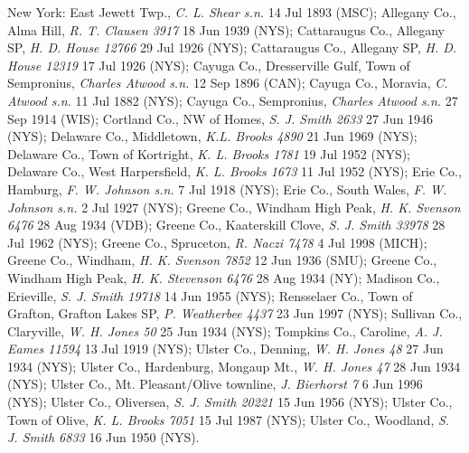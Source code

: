 \documentclass{article}
\begin{document}
New York:
East Jewett Twp., \textit{C. L. Shear s.n.} 14 Jul 1893 (MSC);
Allegany Co., Alma Hill, \textit{R. T. Clausen 3917} 18 Jun 1939 (NYS);
Cattaraugus Co., Allegany SP, \textit{H. D. House 12766} 29 Jul 1926 (NYS);
Cattaraugus Co., Allegany SP, \textit{H. D. House 12319} 17 Jul 1926 (NYS);
Cayuga Co., Dresserville Gulf, Town of Sempronius, \textit{Charles Atwood s.n.} 12 Sep 1896 (CAN);
Cayuga Co., Moravia, \textit{C. Atwood s.n.} 11 Jul 1882 (NYS);
Cayuga Co., Sempronius, \textit{Charles Atwood s.n.} 27 Sep 1914 (WIS);
Cortland Co., NW of Homes, \textit{S. J. Smith 2633} 27 Jun 1946 (NYS);
Delaware Co., Middletown, \textit{K.L. Brooks 4890} 21 Jun 1969 (NYS);
Delaware Co., Town of Kortright, \textit{K. L. Brooks 1781} 19 Jul 1952 (NYS);
Delaware Co., West Harpersfield, \textit{K. L. Brooks 1673} 11 Jul 1952 (NYS);
Erie Co., Hamburg, \textit{F. W. Johnson s.n.} 7 Jul 1918 (NYS);
Erie Co., South Wales, \textit{F. W. Johnson s.n.} 2 Jul 1927 (NYS);
Greene Co., Windham High Peak, \textit{H. K. Svenson 6476} 28 Aug 1934 (VDB);
Greene Co., Kaaterskill Clove, \textit{S. J. Smith 33978} 28 Jul 1962 (NYS);
Greene Co., Spruceton, \textit{R. Naczi 7478} 4 Jul 1998 (MICH);
Greene Co., Windham, \textit{H. K. Svenson 7852} 12 Jun 1936 (SMU);
Greene Co., Windham High Peak, \textit{H. K. Stevenson 6476} 28 Aug 1934 (NY);
Madison Co., Erieville, \textit{S. J. Smith 19718} 14 Jun 1955 (NYS);
Rensselaer Co., Town of Grafton, Grafton Lakes SP, \textit{P. Weatherbee 4437} 23 Jun 1997 (NYS);
Sullivan Co., Claryville, \textit{W. H. Jones 50} 25 Jun 1934 (NYS);
Tompkins Co., Caroline, \textit{A. J. Eames 11594} 13 Jul 1919 (NYS);
Ulster Co., Denning, \textit{W. H. Jones 48} 27 Jun 1934 (NYS);
Ulster Co., Hardenburg, Mongaup Mt., \textit{W. H. Jones 47} 28 Jun 1934 (NYS);
Ulster Co., Mt. Pleasant/Olive townline, \textit{J. Bierhorst 7} 6 Jun 1996 (NYS);
Ulster Co., Oliversea, \textit{S. J. Smith 20221} 15 Jun 1956 (NYS);
Ulster Co., Town of Olive, \textit{K. L. Brooks 7051} 15 Jul 1987 (NYS);
Ulster Co., Woodland, \textit{S. J. Smith 6833} 16 Jun 1950 (NYS).
\end{document}

